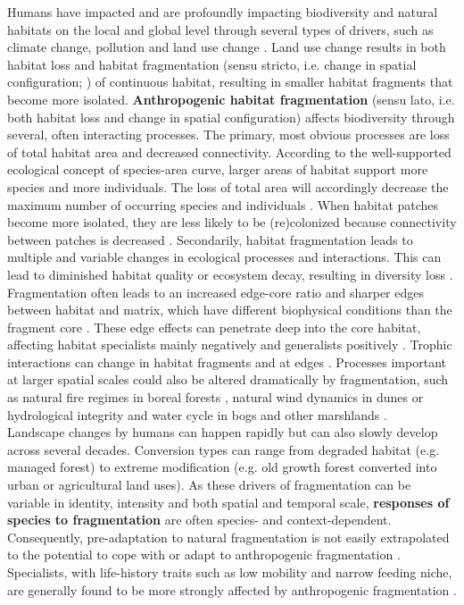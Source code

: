 \documentclass[10pt, twoside]{book} %
\begin{document}
	Humans have impacted and are profoundly impacting biodiversity and natural habitats on the local and global level through several types of drivers, such as climate change, pollution and land use change \citep{cardinale2012, haddad2015}. Land use change results in both habitat loss and habitat fragmentation (sensu stricto, i.e. change in spatial configuration; \citeauthor{fahrig2017} \citeyear{fahrig2017}) of continuous habitat, resulting in smaller habitat fragments that become more isolated. \textbf{Anthropogenic habitat fragmentation} (sensu lato, i.e. both habitat loss and change in spatial configuration) affects biodiversity through several, often interacting processes. The primary, most obvious processes are loss of total habitat area and decreased connectivity. According to the well-supported ecological concept of species-area curve, larger areas of habitat support more species and more individuals. The loss of total area will accordingly decrease the maximum number of occurring species and individuals \citep{macarthur1967, fahrig2013}. When habitat patches become more isolated, they are less likely to be (re)colonized because connectivity between patches is decreased \citep{macarthur1967, hanski1998}. Secondarily, habitat fragmentation leads to multiple and variable changes in ecological processes and interactions. This can lead to diminished habitat quality or ecosystem decay, resulting in diversity loss \citep{chase2020}. Fragmentation often leads to an increased edge-core ratio and sharper edges between habitat and matrix, which have different biophysical conditions than the fragment core \citep{didham1999}. These edge effects can penetrate deep into the core habitat, affecting habitat specialists mainly negatively and generalists positively \citep{pfeifer2017}. Trophic interactions can change in habitat fragments and at edges \citep[e.g.][]{dekeukeleire2019}. Processes important at larger spatial scales could also be altered dramatically by fragmentation, such as natural fire regimes in boreal forests \citep{larjavaara2005}, natural wind dynamics in dunes \citep{provoost2011} or hydrological integrity and water cycle in bogs and other marshlands \citep{mackin2017}.\\
	
	Landscape changes by humans can happen rapidly but can also slowly develop across several decades. Conversion types can range from degraded habitat (e.g. managed forest) to extreme modification (e.g. old growth forest converted into urban or agricultural land uses). As these drivers of fragmentation can be variable in identity, intensity and both spatial and temporal scale, \textbf{responses of species to fragmentation} are often species- and context-dependent. Consequently, pre-adaptation to natural fragmentation is not easily extrapolated to the potential to cope with or adapt to anthropogenic fragmentation \citep{cheptou2017}. Specialists, with life-history traits such as low mobility and narrow feeding niche, are generally found to be more strongly affected by anthropogenic fragmentation \citep{ockinger2010, pfeifer2017}.\\
	
\end{document}
